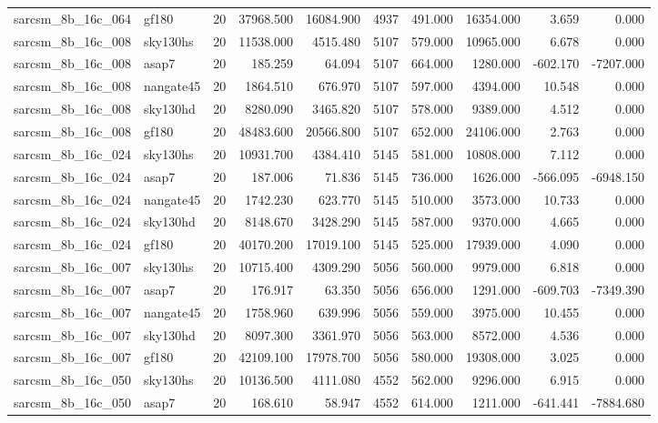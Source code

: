 \begin{longtable}{llrrrrrrrr}
sarcsm\_8b\_16c\_064 & gf180 & 20 & 37968.500 & 16084.900 & 4937 & 491.000 & 16354.000 & 3.659 & 0.000 \\
sarcsm\_8b\_16c\_008 & sky130hs & 20 & 11538.000 & 4515.480 & 5107 & 579.000 & 10965.000 & 6.678 & 0.000 \\
sarcsm\_8b\_16c\_008 & asap7 & 20 & 185.259 & 64.094 & 5107 & 664.000 & 1280.000 & -602.170 & -7207.000 \\
sarcsm\_8b\_16c\_008 & nangate45 & 20 & 1864.510 & 676.970 & 5107 & 597.000 & 4394.000 & 10.548 & 0.000 \\
sarcsm\_8b\_16c\_008 & sky130hd & 20 & 8280.090 & 3465.820 & 5107 & 578.000 & 9389.000 & 4.512 & 0.000 \\
sarcsm\_8b\_16c\_008 & gf180 & 20 & 48483.600 & 20566.800 & 5107 & 652.000 & 24106.000 & 2.763 & 0.000 \\
sarcsm\_8b\_16c\_024 & sky130hs & 20 & 10931.700 & 4384.410 & 5145 & 581.000 & 10808.000 & 7.112 & 0.000 \\
sarcsm\_8b\_16c\_024 & asap7 & 20 & 187.006 & 71.836 & 5145 & 736.000 & 1626.000 & -566.095 & -6948.150 \\
sarcsm\_8b\_16c\_024 & nangate45 & 20 & 1742.230 & 623.770 & 5145 & 510.000 & 3573.000 & 10.733 & 0.000 \\
sarcsm\_8b\_16c\_024 & sky130hd & 20 & 8148.670 & 3428.290 & 5145 & 587.000 & 9370.000 & 4.665 & 0.000 \\
sarcsm\_8b\_16c\_024 & gf180 & 20 & 40170.200 & 17019.100 & 5145 & 525.000 & 17939.000 & 4.090 & 0.000 \\
sarcsm\_8b\_16c\_007 & sky130hs & 20 & 10715.400 & 4309.290 & 5056 & 560.000 & 9979.000 & 6.818 & 0.000 \\
sarcsm\_8b\_16c\_007 & asap7 & 20 & 176.917 & 63.350 & 5056 & 656.000 & 1291.000 & -609.703 & -7349.390 \\
sarcsm\_8b\_16c\_007 & nangate45 & 20 & 1758.960 & 639.996 & 5056 & 559.000 & 3975.000 & 10.455 & 0.000 \\
sarcsm\_8b\_16c\_007 & sky130hd & 20 & 8097.300 & 3361.970 & 5056 & 563.000 & 8572.000 & 4.536 & 0.000 \\
sarcsm\_8b\_16c\_007 & gf180 & 20 & 42109.100 & 17978.700 & 5056 & 580.000 & 19308.000 & 3.025 & 0.000 \\
sarcsm\_8b\_16c\_050 & sky130hs & 20 & 10136.500 & 4111.080 & 4552 & 562.000 & 9296.000 & 6.915 & 0.000 \\
sarcsm\_8b\_16c\_050 & asap7 & 20 & 168.610 & 58.947 & 4552 & 614.000 & 1211.000 & -641.441 & -7884.680 \\

\end{longtable}
